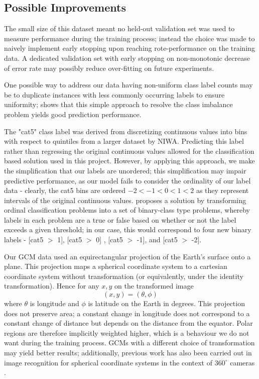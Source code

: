 \documentclass[11pt,a4paper, titlepage]{article}
\begin{document}
\subsection{Possible Improvements}
The small size of this dataset meant no held-out validation set was used to measure performance during the training process; instead the choice was made to naively implement early stopping upon reaching rote-performance on the training data. A dedicated validation set with early stopping on non-monotonic decrease of error rate may possibly reduce over-fitting on future experiments.

\smallskip

One possible way to address our data having non-uniform class label counts may be to duplicate instances with less commonly occurring labels to ensure uniformity; \cite{buda2018systematic} shows that this simple approach to resolve the class imbalance problem yields good prediction performance.

\smallskip

The "cat5" class label was derived from discretizing continuous values into bins with respect to quintiles from a larger dataset by NIWA. Predicting this label rather than regressing the original continuous values allowed for the classification based solution used in this project. However, by applying this approach, we make the simplification that our labels are unordered; this simplification may impair predictive performance, as our model fails to consider the ordinality of our label data - clearly, the cat5 bins are ordered $-2 < -1 < 0 < 1 < 2$ as they represent intervals of the original continuous values. \cite{frank2001simple} proposes a solution by transforming ordinal classification problems into a set of binary-class type problems, whereby labels in each problem are a true or false based on whether or not the label exceeds a given threshold; in our case, this would correspond to four new binary labels - [cat5 $>$ 1], [cat5 $>$ 0] , [cat5 $>$ -1], and [cat5 $>$ -2].

\smallskip

Our GCM data used an equirectangular projection of the Earth's surface onto a plane. This projection maps a spherical coordinate system to a cartesian coordinate system without transformation (or equivalently, under the identity transformation). Hence for any $x, y$ on the transformed image $$(x, y) =(\theta, \phi)$$ where $\theta$ is longitude and $\phi$ is latitude on the Earth in degrees. This projection does not preserve area; a constant change in longitude does not correspond to a constant change of distance but depends on the distance from the equator. Polar regions are therefore implicitly weighted higher, which is a behaviour we do not want during the training process. GCMs with a different choice of transformation may yield better results; additionally, previous work has also been carried out in image recognition for spherical coordinate systems in the context of $360^{\circ}$ cameras \cite{su2017learning}.
\end{document}
